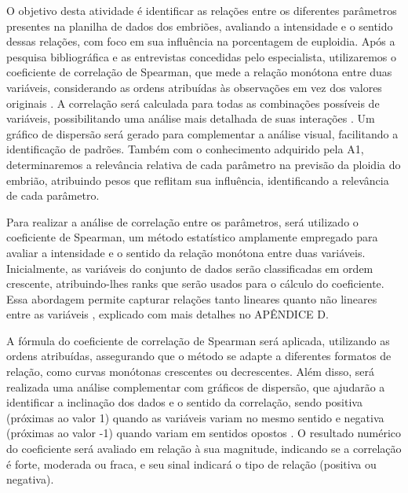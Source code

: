 O objetivo desta atividade é identificar as relações entre os diferentes parâmetros presentes na planilha de dados dos embriões, avaliando a intensidade e o sentido dessas relações, com foco em sua influência na porcentagem de euploidia. Após a pesquisa bibliográfica e as entrevistas concedidas pelo especialista, utilizaremos o coeficiente de correlação de Spearman, que mede a relação monótona entre duas variáveis, considerando as ordens atribuídas às observações em vez dos valores originais \cite{sousa2019}. A correlação será calculada para todas as combinações possíveis de variáveis, possibilitando uma análise mais detalhada de suas interações \cite{sousa2019}. Um gráfico de dispersão será gerado para complementar a análise visual, facilitando a identificação de padrões. Também com o conhecimento adquirido pela A1, determinaremos a relevância relativa de cada parâmetro na previsão da ploidia do embrião, atribuindo pesos que reflitam sua influência, identificando a relevância de cada parâmetro.

Para realizar a análise de correlação entre os parâmetros, será utilizado o coeficiente de Spearman, um método estatístico amplamente empregado para avaliar a intensidade e o sentido da relação monótona entre duas variáveis. Inicialmente, as variáveis do conjunto de dados serão classificadas em ordem crescente, atribuindo-lhes ranks que serão usados para o cálculo do coeficiente. Essa abordagem permite capturar relações tanto lineares quanto não lineares entre as variáveis \cite{sousa2019}, explicado com mais detalhes no APÊNDICE D. 

A fórmula do coeficiente de correlação de Spearman será aplicada, utilizando as ordens atribuídas, assegurando que o método se adapte a diferentes formatos de relação, como curvas monótonas crescentes ou decrescentes. Além disso, será realizada uma análise complementar com gráficos de dispersão, que ajudarão a identificar a inclinação dos dados e o sentido da correlação, sendo positiva (próximas ao valor 1) quando as variáveis variam no mesmo sentido e negativa (próximas ao valor -1) quando variam em sentidos opostos \cite{sousa2019}. O resultado numérico do coeficiente será avaliado em relação à sua magnitude, indicando se a correlação é forte, moderada ou fraca, e seu sinal indicará o tipo de relação (positiva ou negativa). 

